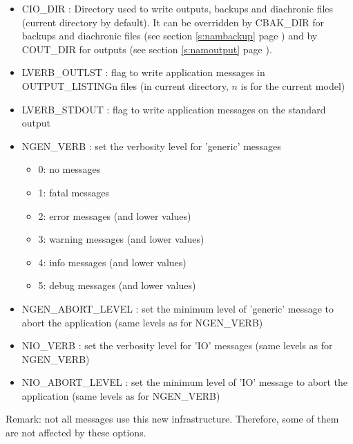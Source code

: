 \begin{itemize}

\item
CIO\_DIR : Directory used to write outputs, backups and diachronic files (current directory by default).
It can be overridden by CBAK\_DIR for backups and diachronic files (see section \ref{s:nambackup} page \pageref{s:nambackup})
and by COUT\_DIR for outputs (see section \ref{s:namoutput} page \pageref{s:namoutput}).

\item
LVERB\_OUTLST : flag to write application messages in OUTPUT\_LISTINGn files (in current directory, $n$ is for the current model)

\item
LVERB\_STDOUT : flag to write application messages on the standard output

\item
NGEN\_VERB : set the verbosity level for 'generic' messages
\begin{itemize}
\item 0: no messages
\item 1: fatal messages
\item 2: error messages (and lower values)
\item 3: warning messages (and lower values)
\item 4: info messages (and lower values)
\item 5: debug messages (and lower values)
\end{itemize}

\item
NGEN\_ABORT\_LEVEL : set the minimum level of 'generic' message to abort the application (same levels as for NGEN\_VERB)

\item
NIO\_VERB : set the verbosity level for 'IO' messages (same levels as for NGEN\_VERB)

\item
NIO\_ABORT\_LEVEL : set the minimum level of 'IO' message to abort the application (same levels as for NGEN\_VERB)

\end{itemize}

Remark: not all messages use this new infrastructure. Therefore, some of them are not affected by these options.

